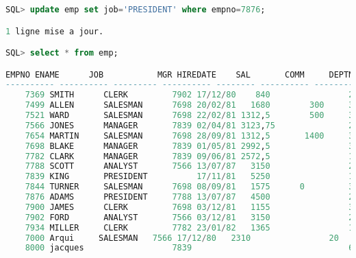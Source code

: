 \documentclass{article}
\begin{document}
\begin{lstlisting}[language=SQL,
    deletekeywords={char},
    morekeywords={DECLARE, LOOP, TYPE, FOR, IF, IS, OPEN, FETCH, DBMS_OUTPUT, PUT_LINE}]
SQL> update emp set job='PRESIDENT' where empno=7876;

1 ligne mise a jour.

SQL> select * from emp;

EMPNO ENAME      JOB	       MGR HIREDATE	   SAL	     COMM     DEPTNO
---------- ---------- --------- ---------- -------- ---------- ---------- ----------
    7369 SMITH      CLERK	      7902 17/12/80	   840			      20
    7499 ALLEN      SALESMAN	  7698 20/02/81	  1680	      300	  30
    7521 WARD       SALESMAN	  7698 22/02/81	1312,5	      500	  30
    7566 JONES      MANAGER	      7839 02/04/81 3123,75			      20
    7654 MARTIN     SALESMAN	  7698 28/09/81	1312,5	     1400	  30
    7698 BLAKE      MANAGER	      7839 01/05/81	2992,5			      30
    7782 CLARK      MANAGER	      7839 09/06/81	2572,5			      10
    7788 SCOTT      ANALYST	      7566 13/07/87	  3150			      20
    7839 KING       PRESIDENT 	       17/11/81	  5250			      10
    7844 TURNER     SALESMAN	  7698 08/09/81	  1575		0	      30
    7876 ADAMS      PRESIDENT     7788 13/07/87	  4500			      20
    7900 JAMES      CLERK	      7698 03/12/81	  1155			      30
    7902 FORD       ANALYST	      7566 03/12/81	  3150			      20
    7934 MILLER     CLERK	      7782 23/01/82	  1365			      10
    7000 Arqui     SALESMAN	  7566 17/12/80	  2310			      20
    8000 jacques		          7839					              64
\end{lstlisting}
\end{document}
